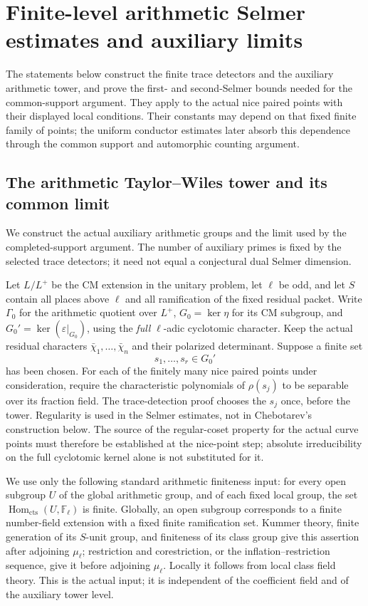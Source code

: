 \section{Finite-level arithmetic Selmer estimates and auxiliary limits}
\label{sec:sr-arithmetic-selmer-producers}
The statements below construct the finite trace detectors and the
auxiliary arithmetic tower, and prove the first- and second-Selmer
bounds needed for the common-support argument.  They apply to the
actual nice paired points with their displayed local conditions.
Their constants may depend on that fixed finite family of points;
the uniform conductor estimates later absorb this dependence through
the common support and automorphic counting argument.


\subsection{The arithmetic Taylor--Wiles tower and its common limit}
\label{sec:arithmetic-tw-tower}

We construct the actual auxiliary arithmetic groups and the limit
used by the completed-support argument.
The number of auxiliary primes is fixed by the selected trace
detectors; it need not equal a conjectural dual Selmer dimension.

Let \(L/L^+\) be the CM extension in the unitary problem, let
\(\ell\) be odd, and let \(S\) contain all places above \(\ell\)
and all ramification of the fixed residual packet.
Write \(\Gamma_0\) for the arithmetic quotient over \(L^+\),
\(G_0=\ker\eta\) for its CM subgroup, and
\(G_0'=\ker(\varepsilon|_{G_0})\), using the \emph{full}
\(\ell\)-adic cyclotomic character.
Keep the actual residual characters \(\bar\chi_1,\ldots,\bar\chi_n\)
and their polarized determinant.
Suppose a finite set
\[
                   s_1,\ldots,s_r\in G_0'
 \tag{TW1}
\]
has been chosen.
For each of the finitely many nice paired points under
consideration, require the characteristic polynomials
of \(\rho(s_j)\) to be separable over its fraction field.
The trace-detection proof chooses the \(s_j\) once, before the
tower.  Regularity is used in the Selmer estimates, not in
Chebotarev's construction below.
The source of the regular-coset property for the actual curve
points must therefore be established at the nice-point step;
absolute irreducibility on the full cyclotomic kernel alone is
not substituted for it.

We use only the following standard arithmetic finiteness input:
for every open subgroup \(U\) of the global arithmetic group,
and of each fixed local group, the set
\(\operatorname{Hom}_{\mathrm{cts}}(U,\mathbb F_\ell)\) is finite.
Globally, an open subgroup corresponds to a finite number-field
extension with a fixed finite ramification set.
Kummer theory, finite generation of its \(S\)-unit group, and
finiteness of its class group give this assertion after adjoining
\(\mu_\ell\); restriction and corestriction, or the
inflation--restriction sequence, give it before adjoining
\(\mu_\ell\).
Locally it follows from local class field theory.
This is the actual  input; it is independent of
the coefficient field and of the auxiliary tower level.

